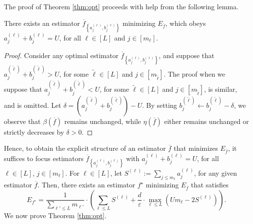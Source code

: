The proof of Theorem \ref{thm:opt} proceeds with help from the following lemma.
\begin{lemma}
	\label{lem:helper}
	There exists an estimator $\overline{f}_{\left\{a_j^{(\ell)},b_j^{(\ell)}\right\}}$ minimizing $E_{\overline{f}}$, which obeys $a_j^{(\ell)}+b_j^{(\ell)} = U$, for all $\ell\in [L]$ and $j\in [m_\ell]$.
\end{lemma}
\begin{proof}
	Consider any optimal estimator $\overline{f}_{\left\{a_j^{(\ell)},b_j^{(\ell)}\right\}}$, and suppose that $a_j^{(\tilde{\ell})}+b_j^{(\tilde{\ell})}>U$, for some $\tilde{\ell}\in [L]$ and $j\in [m_{\tilde{\ell}}]$. The proof when we suppose that $a_j^{(\tilde{\ell})}+b_j^{(\tilde{\ell})}<U$, for some $\tilde{\ell}\in [L]$ and $j\in [m_{\tilde{\ell}}]$, is similar, and is omitted. Let $\delta =  (a_j^{(\tilde{\ell})}+b_j^{(\tilde{\ell})})-U$. By setting $b_j^{(\tilde{\ell})}\gets b_j^{(\tilde{\ell})}-\delta$, we observe that $\beta(\overline{f})$ remains unchanged, while $\eta(\overline{f})$ either remains unchanged or strictly decreases by $\delta>0$.
\end{proof}
Hence, to obtain the explicit structure of an estimator $\overline{f}$ that minimizes $E_{\overline{f}}$, it suffices to focus estimators $\overline{f}_{\left\{a_j^{(\ell)},b_j^{(\ell)}\right\}}$ with $a_j^{(\ell)}+b_j^{(\ell)} = U$, for all $\ell\in [L]$, $j\in [m_\ell]$. For $\ell\in [L]$, let $S^{(\ell)}:= \sum_{j\leq m_\ell} a_j^{(\ell)}$, for any given estimator $\overline{f}$. Then, there exists an estimator $f^\star$ minimizing $E_{\overline{f}}$ that satisfies
\begin{equation}
	\label{eq:optsimp}
	E_{f^\star} = \frac{1}{\sum_{\ell'\leq L} m_{\ell'}}\cdot \left(\sum_{\ell\leq L} S^{(\ell)}+\frac{d}{\varepsilon}\cdot \max_{\ell\leq L} \left(Um_\ell - 2S^{(\ell)}\right)\right).
\end{equation}
We now prove Theorem \ref{thm:opt}.

